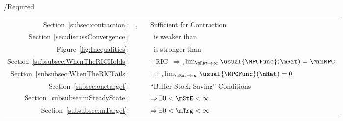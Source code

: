 \documentclass[\econtexRoot/BufferStockTheory]{subfiles}
\begin{document}
\begin{verbatimwrite}{\TableDir/Required}
\begin{table}
{\begin{tabular}{|l|l|l|}
  \\ \cline{2-3}\multicolumn{1}{|r|}{Section~\ref{subsec:contraction}:}                            & \FVAC, \WRIC~                     & Sufficient for Contraction
 \\ \multicolumn{1}{|r|}{Section~\ref{sec:discussConvergence}:}                               &                      & \WRIC~is weaker than \RIC~
\\  \multicolumn{1}{|r|}{Figure~\ref{fig:Inequalities}:}                                        &                                 & \FVAC~is stronger than \PFFVAC~
  \\ \multicolumn{1}{|r|}{Section~\ref{subsubsec:WhenTheRICHolds}:}
                                            &                                 & \cncl{\FHWC}+RIC~$\Rightarrow $\GIC$, \lim_{\mRat \rightarrow \infty} \usual{\MPCFunc}(\mRat)=\MinMPC$
  \\  \multicolumn{1}{|r|}{Section~\ref{subsubsec:WhenTheRICFails}:}                                        &                                 & \cncl{\RIC}  $\Rightarrow $\cncl{\FHWC}$, \lim_{\mRat \rightarrow \infty} \usual{\MPCFunc}(\mRat)=0$
  \\ \cline{3-3}\multicolumn{1}{|r|}{Section~\ref{subsec:onetarget}:}                                        &                                 & ``Buffer Stock Saving'' Conditions
  \\ \multicolumn{1}{|r|}{Section~\ref{subsubsec:mSteadyState}:}                                        &                                 & \phantom{-Nrm}{\GIC} $\Rightarrow \exists 0 < \mStE < \infty$ %
  \\ \multicolumn{1}{|r|}{Section~\ref{subsubsec:mTarget}:}                                        &                                 & {\GICNrm} $\Rightarrow \exists 0 < \mTrg < \infty$ %
                                                                                  

\end{tabular}}
\end{table}
\end{verbatimwrite}
\end{document}
